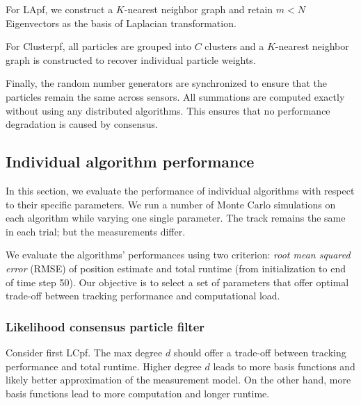 \documentclass[10pt,letterpaper,final]{article}
\begin{document}
For LApf, we construct a $K$-nearest neighbor graph and retain $m< N$ Eigenvectors as the basis of Laplacian transformation. 

For Clusterpf, all particles are grouped into $C$ clusters and a $K$-nearest neighbor graph is constructed to recover individual particle weights. 

Finally, the random number generators are synchronized to ensure that the particles remain the same across sensors. All summations are computed exactly without using any distributed algorithms. This ensures that no performance degradation is caused by consensus.

\subsection{Individual algorithm performance}
In this section, we evaluate the performance of individual algorithms with respect to their specific parameters. We run a number of Monte Carlo simulations on each algorithm while varying one single parameter. The track remains the same in each trial; but the measurements differ. 

We evaluate the algorithms' performances using two criterion: \textit{root mean squared error} (RMSE) of position estimate and total runtime (from initialization to end of time step 50). Our objective is to select a set of parameters that offer optimal trade-off between tracking performance and computational load. 

\subsubsection{Likelihood consensus particle filter}
Consider first LCpf. The max degree $d$ should offer a trade-off between tracking performance and total runtime. Higher degree $d$ leads to more basis functions and likely better approximation of the measurement model. On the other hand, more basis functions lead to more computation and longer runtime. 
\end{document}
